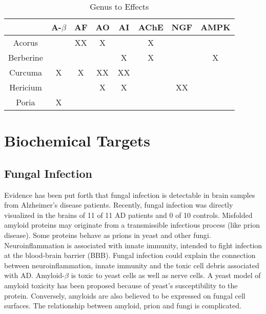 \documentclass[twocolumn]{article}
\begin{document}
\begin{table*}[htp]
\centering

\begin{tabular}{||c c c c c c c c||}
 \hline
                & A-$\beta$ & AF & AO & AI & AChE & NGF & AMPK \\
 \hline\hline
 Acorus         &           & XX &  X &    &   X  &     &      \\
 Berberine      &           &    &    & X  &   X  &     &  X   \\
 Curcuma        &     X     & X  & XX & XX &      &     &      \\
 Hericium       &           &    &  X &  X &      &  XX &      \\
 Poria          &     X     &    &    &    &      &     &      \\
 \hline
\end{tabular}
\caption{Genus to Effects}
\label{table:effects}
\end{table*}



























\section{Biochemical Targets}


\subsection{Fungal Infection}

Evidence has been put forth that fungal infection is detectable
in brain samples from Alzheimer's disease patients.
\cite{alonso2013fungal}
Recently, fungal infection was directly visualized in the brains
of 11 of 11 AD patients and 0 of 10 controls.
\cite{pisa2015different}
Misfolded amyloid proteins may originate from a transmissible infectious process
(like prion disease).
Some proteins behave as prions in yeast and other fungi.
\cite{soto2006amyloids}
Neuroinflammation is associated with innate immunity,
intended to fight infection at the blood-brain barrier (BBB).
\cite{hauwel2005innate}
Fungal infection could explain the connection between
neuroinflammation, innate immunity and the toxic cell
debris associated with AD.
Amyloid-$\beta$ is toxic to yeast cells
as well as nerve cells.
A yeast model of amyloid toxicity has been proposed
because of yeast's susceptibility to the protein.
\cite{treusch2011functional}
Conversely, amyloids are also believed to be
expressed on fungal cell surfaces.
\cite{gebbink2005amyloids}
The relationship between amyloid, prion and fungi is complicated.
\cite{tessier2009unraveling}
\end{document}

